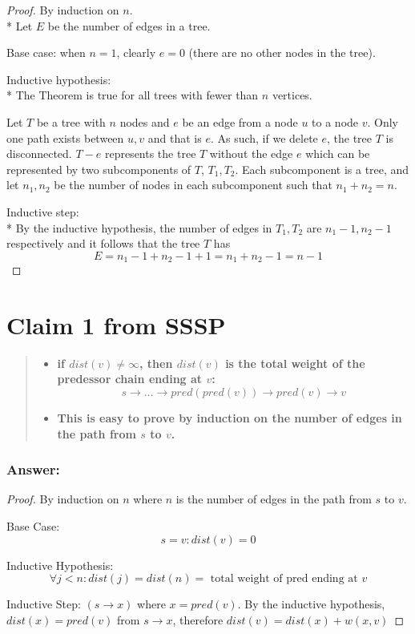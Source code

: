 \documentclass[titlepage]{article}
\theoremstyle{definition}
\begin{document}
\begin{proof}
By induction on $n$. \\*
Let $E$ be the number of edges in a tree.

Base case: when $n =1$, clearly $e = 0$ (there are no other nodes in the tree).

Inductive hypothesis: \\*
The Theorem is true for all trees with fewer than $ n$ vertices.

Let $T$ be a tree with $n$ nodes and $e$ be an edge from a node $u$ to a node
$v$. Only one path exists between $u,v$ and that is $e$. As such, if we delete $e$, the
tree $T$ is disconnected. $T - e$ represents the tree $T$ without the edge $e$
which can be represented by two subcomponents of $T$, $T_1, T_2$. Each
subcomponent is a tree, and let $n_1,n_2$ be the number of nodes in each
subcomponent such that $n_1 + n_2 = n$. 

Inductive step: \\*
By the inductive hypothesis, the number of edges in $T_1, T_2$ are $n_1-1,
n_2-1$
respectively and it follows that the tree $T$ has 
\[ E = n_1 -1 + n_2 -1 +1 = n_1 + n_2-1 = n-1 \]
  \qedhere
\end{proof}


\section{Claim 1 from SSSP}
  \begin{quote}
  \begin{itemize}
    \item \textbf{if $dist(v) \neq \infty $, then $dist(v)$ is the total weight
    of the predessor chain ending at $v$:
    \[ s \rightarrow \dots \rightarrow pred(pred(v)) \rightarrow pred(v) \rightarrow v \] }
    \item \textbf{This is easy to prove by induction on the number of edges in
    the path from $s$ to $v$.}
  \end{itemize}
  \end{quote}

  \subsubsection{Answer:}
    \begin{proof}
      By induction on $n$ where $n$ is the number of edges in the path from
      $s$ to $v$. 

      Base Case: 
      \[ s = v: dist(v) = 0 \]

      Inductive Hypothesis:
      \[ \forall j < n: dist(j) = dist(n) = \text{ total weight of pred ending at } v \]

      Inductive Step:
      $(s \rightarrow x)$ where $x = pred(v)$. By the inductive hypothesis,
      $dist(x) = pred(v)$ from $s \rightarrow x$, therefore $dist(v) = dist(x) + w(x,v)$
    \end{proof}
\end{document}
